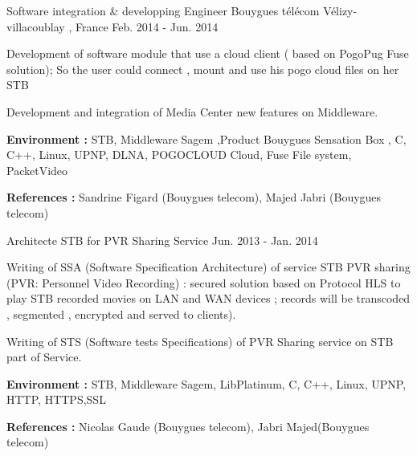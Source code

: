\documentclass[11pt, a4paper]{awesome-cv} %
\begin{document}
\begin{cventries}
    \cventry
    {Software integration \& developping Engineer} %
    {Bouygues télécom} %
    {Vélizy-villacoublay , France} %
    {Feb. 2014 - Jun. 2014} %
    { %
        \begin{cvitems}
            \item {Development of software module that use a cloud client ( based on PogoPug Fuse solution); So the user could connect , mount  and use his pogo cloud files on her STB}
            \item {Development and integration of Media Center new features on Middleware.}
            \item { \textbf{Environment :} STB, Middleware Sagem ,Product Bouygues Sensation Box ,  C, C++, Linux, UPNP, DLNA, POGOCLOUD Cloud, Fuse File system,  PacketVideo }
            \item { \textbf{References :} Sandrine Figard (Bouygues telecom), Majed Jabri (Bouygues telecom) }
        \end{cvitems}
    }

    \cventry
    {Architecte STB for PVR Sharing Service} %
    {}{}
    {Jun. 2013  - Jan. 2014}
    { %
        \begin{cvitems}
            \item {Writing of SSA  (Software Specification Architecture) of service STB PVR sharing (PVR: Personnel Video Recording)  : secured solution based on Protocol HLS  to play STB recorded movies on LAN and WAN devices ; records will be transcoded , segmented , encrypted and served to clients).}
            \item {Writing of STS (Software tests Specifications) of PVR Sharing service on STB part of Service.  }
            \item { \textbf{Environment :} STB, Middleware Sagem, LibPlatinum, C, C++, Linux, UPNP, HTTP, HTTPS,SSL }
            \item { \textbf{References :}  Nicolas Gaude (Bouygues telecom), Jabri Majed(Bouygues telecom) }
        \end{cvitems}
    }


\end{cventries}
\end{document}
